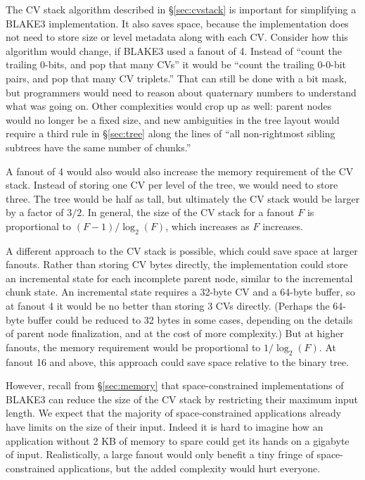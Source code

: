 \documentclass[11pt,notitlepage,a4paper]{article}
\begin{document}
The CV stack algorithm described in \S\ref{sec:cvstack} is important for
simplifying a BLAKE3 implementation. It also saves space, because the
implementation does not need to store size or level metadata along with each
CV. Consider how this algorithm would change, if BLAKE3 used a fanout of 4.
Instead of ``count the trailing 0-bits, and pop that many CVs'' it would be
``count the trailing 0-0-bit pairs, and pop that many CV triplets.'' That can
still be done with a bit mask, but programmers would need to reason about
quaternary numbers to understand what was going on. Other complexities would
crop up as well: parent nodes would no longer be a fixed size, and new
ambiguities in the tree layout would require a third rule in \S\ref{sec:tree}
along the lines of ``all non-rightmost sibling subtrees have the same number of
chunks.''

A fanout of 4 would also would also increase the memory requirement of the CV
stack. Instead of storing one CV per level of the tree, we would need to store
three. The tree would be half as tall, but ultimately the CV stack would be
larger by a factor of $3/2$. In general, the size of the CV stack for a fanout
$F$ is proportional to $(F-1)/\log_2(F)$, which increases as $F$ increases.

A different approach to the CV stack is possible, which could save space at
larger fanouts. Rather than storing CV bytes directly, the implementation could
store an incremental state for each incomplete parent node, similar to the
incremental chunk state. An incremental state requires a 32-byte CV and a
64-byte buffer, so at fanout 4 it would be no better than storing 3 CVs
directly. (Perhaps the 64-byte buffer could be reduced to 32 bytes in some
cases, depending on the details of parent node finalization, and at the cost of
more complexity.) But at higher fanouts, the memory requirement would be
proportional to $1/\log_2(F)$. At fanout 16 and above, this approach could save
space relative to the binary tree.

However, recall from \S\ref{sec:memory} that space-constrained implementations
of BLAKE3 can reduce the size of the CV stack by restricting their maximum
input length. We expect that the majority of space-constrained applications
already have limits on the size of their input. Indeed it is hard to imagine
how an application without 2 KB of memory to spare could get its hands on a
gigabyte of input. Realistically, a large fanout would only benefit a tiny
fringe of space-constrained applications, but the added complexity would hurt
everyone.
\end{document}
